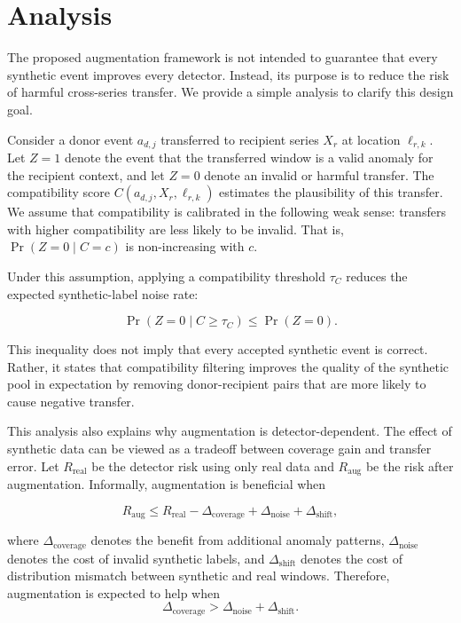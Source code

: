 \documentclass[conference]{IEEEtran}
\begin{document}
\section{Analysis}
\label{sec:analysis}

The proposed augmentation framework is not intended to guarantee that every synthetic event improves every detector. Instead, its purpose is to reduce the risk of harmful cross-series transfer. We provide a simple analysis to clarify this design goal.

Consider a donor event $a_{d,j}$ transferred to recipient series $X_r$ at location $\ell_{r,k}$. Let $Z=1$ denote the event that the transferred window is a valid anomaly for the recipient context, and let $Z=0$ denote an invalid or harmful transfer. The compatibility score $C(a_{d,j},X_r,\ell_{r,k})$ estimates the plausibility of this transfer. We assume that compatibility is calibrated in the following weak sense: transfers with higher compatibility are less likely to be invalid. That is, $\Pr(Z=0\mid C=c)$ is non-increasing with $c$.

Under this assumption, applying a compatibility threshold $\tau_C$ reduces the expected synthetic-label noise rate:

\[
\Pr(Z=0 \mid C\geq \tau_C)
\leq
\Pr(Z=0).
\]

This inequality does not imply that every accepted synthetic event is correct. Rather, it states that compatibility filtering improves the quality of the synthetic pool in expectation by removing donor-recipient pairs that are more likely to cause negative transfer.

This analysis also explains why augmentation is detector-dependent. The effect of synthetic data can be viewed as a tradeoff between coverage gain and transfer error. Let $R_{\mathrm{real}}$ be the detector risk using only real data and $R_{\mathrm{aug}}$ be the risk after augmentation. Informally, augmentation is beneficial when

\[
R_{\mathrm{aug}}
\leq
R_{\mathrm{real}}
-
\Delta_{\mathrm{coverage}}
+
\Delta_{\mathrm{noise}}
+
\Delta_{\mathrm{shift}},
\]

where $\Delta_{\mathrm{coverage}}$ denotes the benefit from additional anomaly patterns, $\Delta_{\mathrm{noise}}$ denotes the cost of invalid synthetic labels, and $\Delta_{\mathrm{shift}}$ denotes the cost of distribution mismatch between synthetic and real windows. Therefore, augmentation is expected to help when
\[
\Delta_{\mathrm{coverage}}
>
\Delta_{\mathrm{noise}}+\Delta_{\mathrm{shift}}.
\]
\end{document}
